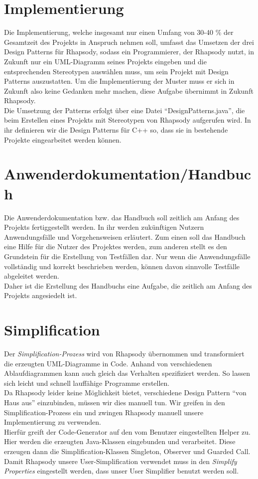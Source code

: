 \section{Implementierung}

Die Implementierung, welche insgesamt nur einen Umfang von 30-40 \% der Gesamtzeit des Projekts in Anspruch nehmen soll, umfasst das Umsetzen der drei Design Patterns für Rhapsody, sodass ein Programmierer, der Rhapsody nutzt, in Zukunft nur ein UML-Diagramm seines Projekts eingeben und die entsprechenden Stereotypen auswählen muss, um sein Projekt mit Design Patterns auszustatten. Um die Implementierung der Muster muss er sich in Zukunft also keine Gedanken mehr machen, diese Aufgabe übernimmt in Zukunft Rhapsody.\\
Die Umsetzung der Patterns erfolgt über eine Datei “DesignPatterns.java”, die beim Erstellen eines Projekts mit Stereotypen von Rhapsody aufgerufen wird. In ihr definieren wir die Design Patterns für C++ so, dass sie in bestehende Projekte eingearbeitet werden können.

\section{Anwenderdokumentation/Handbuch}

Die Anwenderdokumentation bzw. das Handbuch soll zeitlich am Anfang des Projekts fertiggestellt werden. In ihr werden zukünftigen Nutzern Anwendungsfälle und Vorgehensweisen erläutert. Zum einen soll das Handbuch eine Hilfe für die Nutzer des Projektes werden, zum anderen stellt es den Grundstein für die Erstellung von Testfällen dar. Nur wenn die Anwendungsfälle vollständig und korrekt beschrieben werden, können davon sinnvolle Testfälle abgeleitet werden.\\
Daher ist die Erstellung des Handbuchs eine Aufgabe, die zeitlich am Anfang des Projekts angesiedelt ist.

\section{Simplification}
Der \textit{Simplification-Prozess} wird von Rhapsody übernommen und transformiert die
erzeugten UML-Diagramme in Code. Anhand von verschiedenen Ablaufdiagrammen kann
auch gleich das Verhalten spezifiziert werden. So lassen sich leicht und schnell
lauffähige Programme erstellen.\\
\newline
Da Rhapsody leider keine Möglichkeit bietet, verschiedene Design Pattern
\enquote{von Haus aus} einzubinden, müssen wir dies manuell tun. Wir greifen in
den Simplification-Prozess ein und zwingen Rhapsody manuell unsere Implementierung
zu verwenden.\\
Hierfür greift der Code-Generator auf den vom Benutzer eingestellten Helper zu.
Hier werden die erzeugten Java-Klassen eingebunden und verarbeitet. Diese
erzeugen dann die Simplification-Klassen Singleton, Observer und Guarded Call.
Damit Rhapsody unsere User-Simplification verwendet muss in den \textit{Simplify
Properties} eingestellt werden, dass unser User Simplifier benutzt werden soll.
\cite{oldDoku}

